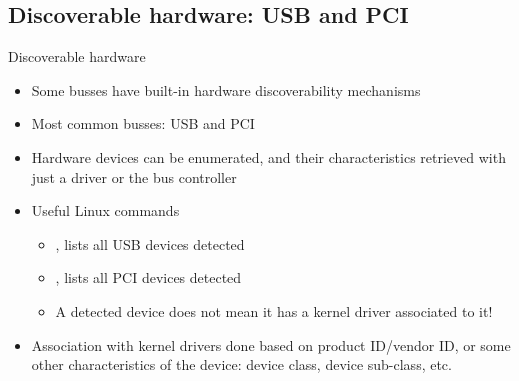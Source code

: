 \subsection{Discoverable hardware: USB and PCI}

\begin{frame}{Discoverable hardware}
  \begin{itemize}
  \item Some busses have built-in hardware discoverability mechanisms
  \item Most common busses: USB and PCI
  \item Hardware devices can be enumerated, and their characteristics
    retrieved with just a driver or the bus controller
  \item Useful Linux commands
    \begin{itemize}
    \item {}, lists all USB devices detected
    \item {}, lists all PCI devices detected
    \item A detected device does not mean it has a kernel driver
      associated to it!
    \end{itemize}
  \item Association with kernel drivers done based on product
    ID/vendor ID, or some other characteristics of the device: device
    class, device sub-class, etc.
  \end{itemize}
\end{frame}
